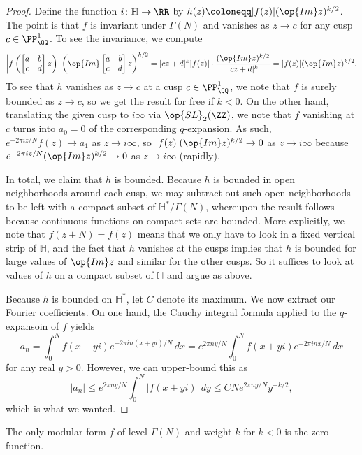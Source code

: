 \documentclass{amsart}
\begin{document}
\begin{proof}
	Define the function $i\colon\mathbb H\to\RR$ by $h(z)\coloneqq|f(z)|(\op{Im}z)^{k/2}$. The point is that $f$ is invariant under $\Gamma(N)$ and vanishes as $z\to c$ for any cusp $c\in\PP^1_\QQ$. To see the invariance, we compute
	\[\left|f\left(\begin{bmatrix}
		a & b \\
		c & d
	\end{bmatrix}z\right)\right|\left(\op{Im}\begin{bmatrix}
		a & b \\
		c & d
	\end{bmatrix}z\right)^{k/2}=|cz+d|^k|f(z)|\cdot\frac{(\op{Im}z)^{k/2}}{|cz+d|^{k}}=|f(z)|(\op{Im}z)^{k/2}.\]
	To see that $h$ vanishes as $z\to c$ at a cusp $c\in\PP^1_\QQ$, we note that $f$ is surely bounded as $z\to c$, so we get the result for free if $k<0$. On the other hand, translating the given cusp to $i\infty$ via $\op{SL}_2(\ZZ)$, we note that $f$ vanishing at $c$ turns into $a_0=0$ of the corresponding $q$-expansion. As such, $e^{-2\pi iz/N}f(z)\to a_1$ as $z\to i\infty$, so $|f(z)|(\op{Im}z)^{k/2}\to 0$ as $z\to i\infty$ because $e^{-2\pi iz/N}(\op{Im}z)^{k/2}\to0$ as $z\to i\infty$ (rapidly).

	In total, we claim that $h$ is bounded. Because $h$ is bounded in open neighborhoods around each cusp, we may subtract out such open neighborhoods to be left with a compact subset of $\mathbb H^*/\Gamma(N)$, whereupon the result follows because continuous functions on compact sets are bounded. More explicitly, we note that $f(z+N)=f(z)$ means that we only have to look in a fixed vertical strip of $\mathbb H$, and the fact that $h$ vanishes at the cusps implies that $h$ is bounded for large values of $\op{Im}z$ and similar for the other cusps. So it suffices to look at values of $h$ on a compact subset of $\mathbb H$ and argue as above.

	Because $h$ is bounded on $\mathbb H^*$, let $C$ denote its maximum. We now extract our Fourier coefficients. On one hand, the Cauchy integral formula applied to the $q$-expansoin of $f$ yields
	\[a_n=\int_0^Nf(x+yi)e^{-2\pi in(x+yi)/N}\,dx=e^{2\pi ny/N}\int_0^Nf(x+yi)e^{-2\pi inx/N}\,dx\]
	for any real $y>0$. However, we can upper-bound this as
	\[|a_n|\le e^{2\pi ny/N}\int_0^N|f(x+yi)|\,dy\le CNe^{2\pi ny/N}y^{-k/2},\]
	which is what we wanted.
\end{proof}
\begin{corollary}
	The only modular form $f$ of level $\Gamma(N)$ and weight $k$ for $k<0$ is the zero function.
\end{corollary}
\end{document}
